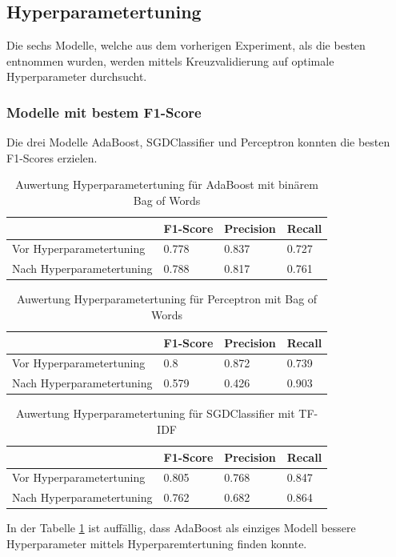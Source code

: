 \subsection{Hyperparametertuning}
Die sechs Modelle, welche aus dem vorherigen Experiment, als die besten entnommen wurden, werden mittels Kreuzvalidierung auf optimale Hyperparameter durchsucht.
\subsubsection{Modelle mit bestem F1-Score}
Die drei Modelle AdaBoost, SGDClassifier und Perceptron konnten die besten F1-Scores erzielen.\\
\begin{table}[H]
	\caption{Auwertung Hyperparametertuning für AdaBoost mit binärem Bag of Words}
	\centering
	\label{tab:ada}
	\begin{tabular}{|l|l|l|l|}
		\hline
		 & F1-Score & Precision & Recall\\
		\hline
		Vor Hyperparametertuning & 0.778 & 0.837 & 0.727 \\
		Nach Hyperparametertuning & 0.788 & 0.817 & 0.761 \\
		\hline
	\end{tabular}
\end{table}
\begin{table}[H]
	\caption{Auwertung Hyperparametertuning für Perceptron mit Bag of Words}
	\centering
	\label{tab:per}
	\begin{tabular}{|l|l|l|l|}
		\hline
		& F1-Score & Precision & Recall\\
		\hline
		Vor Hyperparametertuning & 0.8 & 0.872 & 0.739 \\
		Nach Hyperparametertuning & 0.579 & 0.426 & 0.903 \\
		\hline
	\end{tabular}
\end{table}
\begin{table}[H]
	\caption{Auwertung Hyperparametertuning für SGDClassifier mit TF-IDF}
	\centering
	\label{tab:sgd}
	\begin{tabular}{|l|l|l|l|}
		\hline
		& F1-Score & Precision & Recall\\
		\hline
		Vor Hyperparametertuning & 0.805 & 0.768 & 0.847 \\
		Nach Hyperparametertuning & 0.762 & 0.682 & 0.864 \\
		\hline
	\end{tabular}
\end{table}
In der Tabelle \cref{tab:ada} ist auffällig, dass AdaBoost als einziges Modell bessere Hyperparameter mittels Hyperparemtertuning finden konnte.\\
